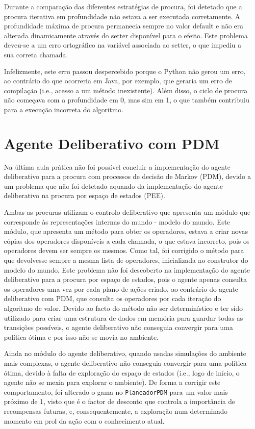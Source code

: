 Durante a comparação das diferentes estratégias de procura, foi detetado que a procura iterativa em profundidade não estava a ser executada corretamente.
A profundidade máxima de procura permanecia sempre no valor default e não era alterada dinamicamente através do setter disponível para o efeito.
Este problema deveu-se a um erro ortográfico na variável associada ao setter, o que impediu a sua correta chamada.

Infelizmente, este erro passou despercebido porque o Python não gerou um erro, ao contrário do que ocorreria em Java, por exemplo, que geraria um erro de compilação (i.e., acesso a um método inexistente).
Além disso, o ciclo de procura não começava com a profundidade em 0, mas sim em 1, o que também contribuiu para a execução incorreta do algoritmo.

\section{Agente Deliberativo com PDM}\label{sec:agente-deliberativo-com-pdm}

Na última aula prática não foi possível concluir a implementação do agente deliberativo para a procura com processos de decisão de Markov (PDM), devido a um problema que não foi detetado aquando da implementação do agente deliberativo na procura por espaço de estados (PEE).

Ambas as procuras utilizam o controlo deliberativo que apresenta um módulo que corresponde às representações internas do mundo - modelo do mundo.
Este módulo, que apresenta um método para obter os operadores, estava a criar novas cópias dos operadores disponíveis a cada chamada, o que estava incorreto, pois os operadores devem ser sempre os mesmos.
Como tal, foi corrigido o método para que devolvesse sempre a mesma lista de operadores, inicializada no construtor do modelo do mundo.
Este problema não foi descoberto na implementação do agente deliberativo para a procura por espaço de estados, pois o agente apenas consulta os operadores uma vez por cada plano de ações criado, ao contrário do agente deliberativo com PDM, que consulta os operadores por cada iteração do algoritmo de valor.
Devido ao facto do método não ser determinístico e ter sido utilizado para criar uma estrutura de dados em memória para guardar todas as transições possíveis, o agente deliberativo não conseguia convergir para uma política ótima e por isso não se movia no ambiente.

Ainda no módulo do agente deliberativo, quando usadas simulações do ambiente mais complexas, o agente deliberativo não conseguia convergir para uma política ótima, devido à falta de exploração do espaço de estados (i.e., logo de início, o agente não se mexia para explorar o ambiente).
De forma a corrigir este comportamento, foi alterado o gama no \texttt{PlaneadorPDM} para um valor mais próximo de 1, visto que é o factor de desconto que controla a importância de recompensas futuras, e, consequentemente, a exploração num determinado momento em prol da ação com o conhecimento atual.

